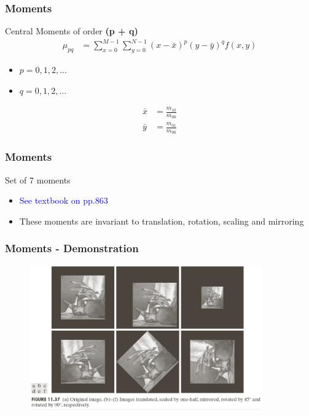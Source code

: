 \documentclass[english,11pt,table,handout]{beamer}
\begin{document}
\frame
{
	\frametitle{Moments}
	\large
	
	\begin{alertblock}{Central Moments of order \textbf{(p + q) }}
		\begin{equation}
		\begin{split}
		\nonumber
		\mu_{pq} &= \sum_{x = 0}^{M-1}{ \sum_{y = 0}^{N-1} {(x - \bar{x})^p (y - \bar{y})^q f(x,y)} } 
		\end{split}
		\end{equation}
		\begin{itemize}
			\item $p = 0, 1, 2, ...$
			\item $q = 0, 1, 2, ...$
		\end{itemize}
		
		\begin{equation}
		\begin{split}
		\nonumber
			\bar{x} &= \frac{m_{10} }{m_{00}} \\
			\bar{y} &= \frac{m_{01} }{m_{00}}
		\end{split}
		\end{equation}
		
	\end{alertblock}
}

\frame
{
	\frametitle{Moments}
	\large
	
	\begin{alertblock}{Set of 7 moments}
		\begin{itemize}
			\item \textcolor{blue}{See textbook on pp.863}
			\item These moments are invariant to translation, rotation, scaling and mirroring 
		\end{itemize}
		
	\end{alertblock}
}

\frame
{
	\frametitle{Moments - Demonstration}
	\begin{figure}[!h]
		\includegraphics[width=10cm]{moment_1.png}
	\end{figure}
}
\end{document}
